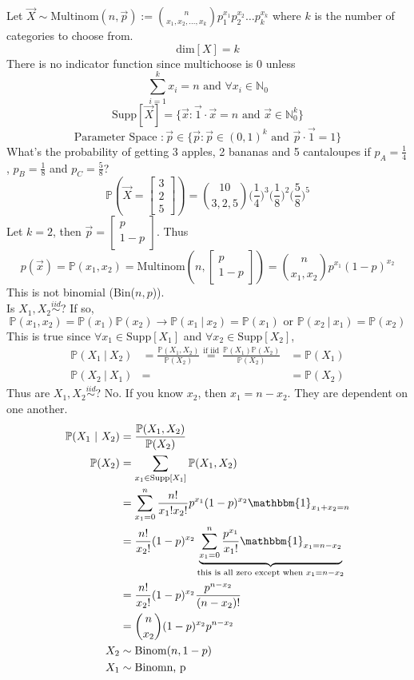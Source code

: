 \documentclass[12pt]{article}
\newcommand{\prob}[1]{\mathbb{P}(#1)}
\newcommand{\cprob}[2]{\mathbb{P}(#1 ~|~ #2)}
\newcommand{\indicator}[1]{\mathbbm{1}_{#1}}
\newcommand{\iid}{\stackrel{iid}{\sim}}
\begin{document}
Let $\vec{X} \sim \text{Multinom}(n, \vec{p}) := \binom{n}{x_1, x_2, \dots, x_k}p_1^{x_1}p_2^{x_2}\dots p_k^{x_k}$ where $k$ is the number of categories to choose from. $$\text{dim}[X] = k$$ There is no indicator function since multichoose is 0 unless $$\sum_{i = 1}^k x_i = n \text{ and } \forall x_i \in \mathbb{N}_0$$ 
$$\text{Supp}[\vec{X}] = \{ \vec{x} : \vec{1} \cdot \vec{x} = n \text{ and } \vec{x} \in \mathbb{N}_0^k\} $$ $$\text{Parameter Space }: \vec{p} \in \{\vec{p}: \vec{p} \in (0, 1)^k \text{ and } \vec{p} \cdot \vec{1} = 1 \} $$ 
What's the probability of getting 3 apples, 2 bananas and 5 cantaloupes if $p_A = \frac{1}{4}$, $p_B = \frac{1}{8}$ and $p_C = \frac{5}{8}$? 
$$\prob{\vec{X} = \begin{bmatrix} 3 \\ 2 \\ 5 \end{bmatrix}} = \binom{10}{3, 2, 5} \Big(\frac{1}{4}\Big)^3\Big(\frac{1}{8}\Big)^2\Big(\frac{5}{8}\Big)^5 $$ 
Let $k = 2$, then $\vec{p} = \begin{bmatrix} p \\ 1 - p \end{bmatrix}$. Thus 
$$p(\vec{x}) = \prob{x_1, x_2} = \text{Multinom}(n, \begin{bmatrix} p \\ 1 - p \end{bmatrix}) = \binom{n}{x_1, x_2} p^{x_1}(1 - p)^{x_2} $$ This is not binomial (Bin($n, p$)). \\
Is $X_1, X_2 \iid$? If so, $$\prob{x_1, x_2} = \prob{x_1}\prob{x_2} \to \cprob{x_1}{x_2} = \prob{x_1} \text{ or } \cprob{x_2}{x_1} = \prob{x_2} $$ This is true since $\forall x_1 \in \text{Supp}[X_1]$ and $\forall x_2 \in \text{Supp}[X_2]$, $$\begin{aligned} \cprob{X_1}{X_2} &= \frac{\prob{X_1, X_2}}{\prob{X_2}} \stackrel{\text{if iid}}{=} \frac{\prob{X_1}\prob{X_2}}{\prob{X_2}} &= \prob{X_1} \\ \cprob{X_2}{X_1} &= &= \prob{X_2} \end{aligned}$$
Thus are $X_1, X_2 \iid$? No. If you know $x_2$, then $x_1 = n - x_2$. They are dependent on one another. 
$$\begin{aligned} \cprob{X_1}{X_2} &= \frac{\prob{X_1, X_2}}{\prob{X_2}} \\ \prob{X_2} &= \sum_{x_1 \in \text{Supp}[X_1]} \prob{X_1, X_2} \\ &= \sum_{x_1 = 0}^n \frac{n!}{x_1! x_2!} p^{x_1}(1 - p)^{x_2} \indicator{x_1 + x_2 = n} \\ &= \frac{n!}{x_2!} (1 - p)^{x_2} \underbrace{\sum_{x_1 = 0}^n \frac{p^{x_1}}{x_1!} \indicator{x_1 = n - x_2}}_{\text{this is all zero except when } x_1 = n - x_2} \\ &= \frac{n!}{x_2!} (1 - p)^{x_2} \frac{p^{n - x_2}}{(n - x_2)!} \\ &= \binom{n}{x_2}(1 - p)^{x_2}p^{n - x_2} \\ X_2 &\sim \text{Binom}(n, 1 - p) \\ X_1 &\sim \text{Binom{n, p}} \end{aligned} $$ 
\end{document}
